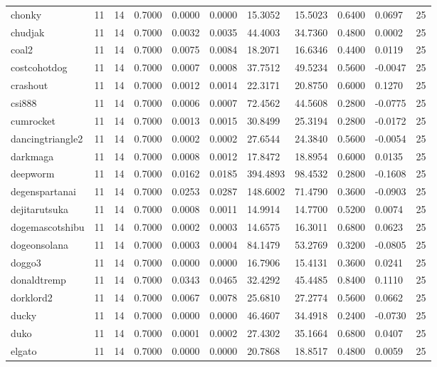 \begin{table}[htbp]
\begin{tabular}{lllllllllll}
chonky & 11 & 14 & 0.7000 & 0.0000 & 0.0000 & 15.3052 & 15.5023 & 0.6400 & 0.0697 & 25 \\
chudjak & 11 & 14 & 0.7000 & 0.0032 & 0.0035 & 44.4003 & 34.7360 & 0.4800 & 0.0002 & 25 \\
coal2 & 11 & 14 & 0.7000 & 0.0075 & 0.0084 & 18.2071 & 16.6346 & 0.4400 & 0.0119 & 25 \\
costcohotdog & 11 & 14 & 0.7000 & 0.0007 & 0.0008 & 37.7512 & 49.5234 & 0.5600 & -0.0047 & 25 \\
crashout & 11 & 14 & 0.7000 & 0.0012 & 0.0014 & 22.3171 & 20.8750 & 0.6000 & 0.1270 & 25 \\
csi888 & 11 & 14 & 0.7000 & 0.0006 & 0.0007 & 72.4562 & 44.5608 & 0.2800 & -0.0775 & 25 \\
cumrocket & 11 & 14 & 0.7000 & 0.0013 & 0.0015 & 30.8499 & 25.3194 & 0.2800 & -0.0172 & 25 \\
dancingtriangle2 & 11 & 14 & 0.7000 & 0.0002 & 0.0002 & 27.6544 & 24.3840 & 0.5600 & -0.0054 & 25 \\
darkmaga & 11 & 14 & 0.7000 & 0.0008 & 0.0012 & 17.8472 & 18.8954 & 0.6000 & 0.0135 & 25 \\
deepworm & 11 & 14 & 0.7000 & 0.0162 & 0.0185 & 394.4893 & 98.4532 & 0.2800 & -0.1608 & 25 \\
degenspartanai & 11 & 14 & 0.7000 & 0.0253 & 0.0287 & 148.6002 & 71.4790 & 0.3600 & -0.0903 & 25 \\
dejitarutsuka & 11 & 14 & 0.7000 & 0.0008 & 0.0011 & 14.9914 & 14.7700 & 0.5200 & 0.0074 & 25 \\
dogemascotshibu & 11 & 14 & 0.7000 & 0.0002 & 0.0003 & 14.6575 & 16.3011 & 0.6800 & 0.0623 & 25 \\
dogeonsolana & 11 & 14 & 0.7000 & 0.0003 & 0.0004 & 84.1479 & 53.2769 & 0.3200 & -0.0805 & 25 \\
doggo3 & 11 & 14 & 0.7000 & 0.0000 & 0.0000 & 16.7906 & 15.4131 & 0.3600 & 0.0241 & 25 \\
donaldtremp & 11 & 14 & 0.7000 & 0.0343 & 0.0465 & 32.4292 & 45.4485 & 0.8400 & 0.1110 & 25 \\
dorklord2 & 11 & 14 & 0.7000 & 0.0067 & 0.0078 & 25.6810 & 27.2774 & 0.5600 & 0.0662 & 25 \\
ducky & 11 & 14 & 0.7000 & 0.0000 & 0.0000 & 46.4607 & 34.4918 & 0.2400 & -0.0730 & 25 \\
duko & 11 & 14 & 0.7000 & 0.0001 & 0.0002 & 27.4302 & 35.1664 & 0.6800 & 0.0407 & 25 \\
elgato & 11 & 14 & 0.7000 & 0.0000 & 0.0000 & 20.7868 & 18.8517 & 0.4800 & 0.0059 & 25 \\

\end{tabular}
\end{table}
